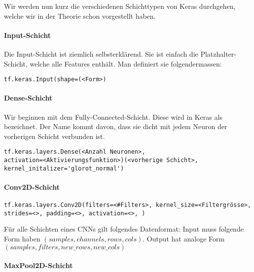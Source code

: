 Wir werden nun kurz die verschiedenen Schichttypen von Keras durchgehen, welche wir in
der Theorie schon vorgestellt haben.
\para{}


\cite{net:keras_init}

\paragraph{Input-Schicht}
Die Input-Schicht ist ziemlich selbsterklärend. Sie ist einfach die
Platzhalter-Schicht, welche alle Features enthält.
Man definiert sie folgendermassen:
\begin{verbatim}
tf.keras.Input(shape=(<Form>)
\end{verbatim}

\paragraph{Dense-Schicht}
Wir beginnen mit dem Fully-Connected-Schicht. Diese wird in Keras als
 bezeichnet. Der Name kommt davon, dass sie dicht mit jedem Neuron
der vorherigen Schicht verbunden ist.
\begin{verbatim}
tf.keras.layers.Dense(<Anzahl Neuronen>,
activation=<Aktivierungsfunktion>)(<vorherige Schicht>, kernel_initalizer='glorot_normal')
\end{verbatim}

\paragraph{Conv2D-Schicht}

\begin{verbatim}
tf.keras.layers.Conv2D(filters=<#Filters>, kernel_size=<Filtergrösse>,
strides=<>, padding=<>, activation=<>, )
\end{verbatim}
Für alle Schichten eines CNNs gilt folgendes Datenformat:
Input muss folgende Form haben $(samples, channels, rows, cols)$. Output hat
analoge Form $(samples, filters, new\_rows, new\_cols)$

\paragraph{MaxPool2D-Schicht}

